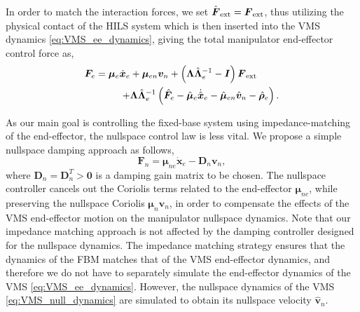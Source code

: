 \documentclass[../main.tex]{subfiles}
\begin{document}
In order to match the interaction forces, we set $\hat{\bm{{F}}}_{\rm ext} = \bm{{F}}_{\rm ext}$, thus utilizing the physical contact of the HILS system which is then inserted into the VMS dynamics \eqref{eq:VMS_ee_dynamics}, giving the total manipulator end-effector control force as,
\begin{equation}
    \begin{aligned}
    \label{eq:Fe}
    \bm{F}_e = \bm{\mu}_e \dot{\bm{x}}_e & + \bm{\mu}_{en} \bm{v}_n + \left(\bm{\Lambda}\hat{\bm{\Lambda}}_e^{-1} - \bm{I}\right)
    \bm{{F}}_{\rm ext} \\
    + & \bm{\Lambda} \hat{\bm{\Lambda}}_e^{-1}\left(
        \hat{\bm{F}}_e
        - \hat{\bm{\mu}}_e \dot{\hat{\bm{x}}}_e
        - \hat{\bm{\mu}}_{en} \hat{\bm{v}}_n
        - \hat{\bm{\rho}}_e
    \right).
    \end{aligned}
\end{equation} \par 
As our main goal is controlling the fixed-base system using impedance-matching of the end-effector, the nullspace control law is less vital. We propose a simple nullspace damping approach as follows,
\begin{equation}
    \label{eq:control_null}
    \bm{F}_n = {\bm{\mu}}_{ne} \dot{{\bm{x}}}_e -\bm{D}_n \bm{v}_n,
\end{equation}
 where $\bm{D}_n = \bm{D}_n^T > \bm{0}$ is a damping gain matrix to be chosen. The nullspace controller cancels out the Coriolis terms related to the end-effector ${\bm{\mu}}_{ne}$, while preserving the nullspace Coriolis ${\bm{\mu}}_{n} {\bm{v}}_n$, in order to compensate the effects of the VMS end-effector motion on the manipulator nullspace dynamics. Note that our impedance matching approach is not affected by the damping controller designed for the nullspace dynamics. The impedance matching strategy ensures that the dynamics of the FBM matches that of the VMS end-effector dynamics, and therefore we do not have to separately simulate the end-effector dynamics of the VMS \eqref{eq:VMS_ee_dynamics}.  However, the nullspace dynamics of the VMS \eqref{eq:VMS_null_dynamics} are simulated to obtain its nullspace velocity $\hat{\bm{v}}_n$. 
\end{document}
